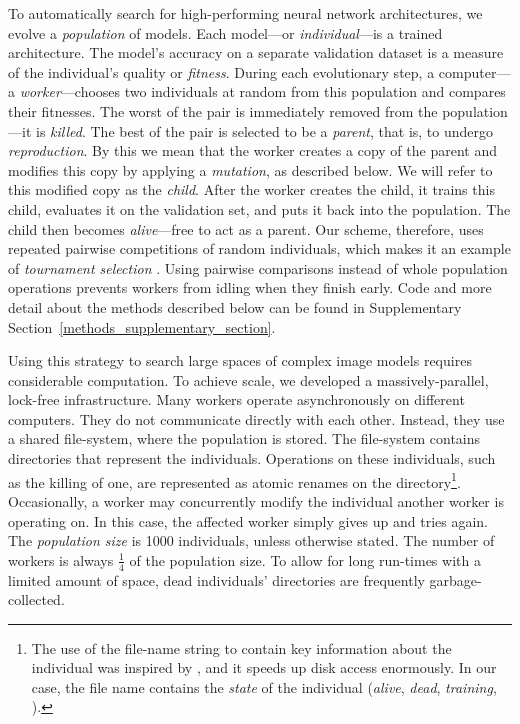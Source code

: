 \documentclass{article}
\renewcommand{\cite}[1]{\citep{#1}}
\begin{document}
To automatically search for high-performing neural network architectures, we evolve a {\em population} of models. Each model---or {\em individual}---is a trained architecture. The model's accuracy on a separate validation dataset is a measure of the individual's quality or {\em fitness}. During each evolutionary step, a computer---a {\em worker}---chooses two individuals at random from this population and compares their fitnesses. The worst of the pair is immediately removed from the population---it is {\em killed}. The best of the pair is selected to be a {\em parent}, that is, to undergo {\em reproduction}. By this we mean that the worker creates a copy of the parent and modifies this copy by applying a {\em mutation}, as described below. We will refer to this modified copy as the {\em child}. After the worker creates the child, it trains this child, evaluates it on the validation set, and puts it back into the population. The child then becomes {\em alive}---\ie free to act as a parent. Our scheme, therefore, uses repeated pairwise competitions of random individuals, which makes it an example of {\em tournament selection} \cite{goldberg1991comparative}. Using pairwise comparisons instead of whole population operations prevents workers from idling when they finish early. Code and more detail about the methods described below can be found in Supplementary Section~\ref{methods_supplementary_section}.

Using this strategy to search large spaces of complex image models requires considerable computation. To achieve scale, we developed a massively-parallel, lock-free infrastructure. Many workers operate asynchronously on different computers. They do not communicate directly with each other. Instead, they use a shared file-system, where the population is stored. The file-system contains directories that represent the individuals. Operations on these individuals, such as the killing of one, are represented as atomic renames on the directory\footnote{The use of the file-name string to contain key information about the individual was inspired by \citet{breuel2010automlp}, and it speeds up disk access enormously. In our case, the file name contains the {\em state} of the individual ({\em alive}, {\em dead}, {\em training}, \etc).}. Occasionally, a worker may concurrently modify the individual another worker is operating on. In this case, the affected worker simply gives up and tries again. The {\em population size} is 1000 individuals, unless otherwise stated. The number of workers is always $\frac{1}{4}$ of the population size. To allow for long run-times with a limited amount of space, dead individuals' directories are frequently garbage-collected.
\end{document}
